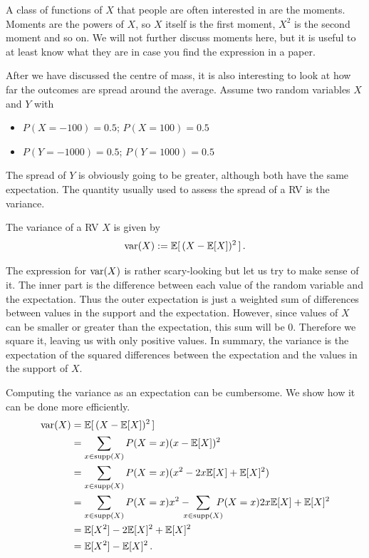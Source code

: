 A class of functions of $ X $ that people are often interested in are
the moments. Moments are the powers of $ X $, so $ X $ itself is the
first moment, $ X^{2} $ is the second moment and so on. We will not
further discuss moments here, but it is useful to at least know what
they are in case you find the expression in a paper.

\medskip
After we have discussed the centre of mass, it is also interesting to look at how far the outcomes are spread around the average. Assume two random variables $ X $ and $ Y $ with
\begin{itemize}
\item $ P(X=-100) = 0.5 $; $ P(X=100) = 0.5 $
\item $ P(Y=-1000) = 0.5 $; $ P(Y=1000) = 0.5 $
\end{itemize}
The spread of $ Y $ is obviously going to be greater, although both have the same expectation. The quantity usually used to assess
the spread of a RV is the variance.

\begin{Definition}[Variance]
The variance of a RV $ X $ is given by
$$ \operatorname{var}(X) := \mathbb{E}[\, (X - \mathbb{E}[X])^{2} \, ] \, .$$
\end{Definition}

The expression for $ \operatorname{var}(X) $ is rather scary-looking but let us try to make sense of it. The inner part is the difference between
each value of the random variable and the expectation. Thus the outer expectation is just a weighted sum of differences between 
values in the support and the expectation. However, since values of $ X $ can be smaller or greater than the expectation, this
sum will be 0. Therefore we square it, leaving us with only positive values. In summary, the variance is the expectation
of the squared differences between the expectation and the values in the support of $ X $.

Computing the variance as an expectation can be cumbersome. We show how it can be done more efficiently.
\begin{align}
\var(X) &= \E[\, (X - \E[X])^{2} \, ] \\
&= \sum_{x \in \supp(X)} P(X=x) (x - \E[X])^{2} \\
&= \sum_{x \in \supp(X)} P(X=x) (x^2 - 2x\E[X] + \E[X]^{2}) \\
&= \sum_{x \in \supp(X)} P(X=x)  x^{2} -  \!\!\!\!\! \sum_{x \in \supp(X)} \!\!\!\!\! P(X=x) 2x\E[X] + \E[X]^{2} \\
&= \E[X^{2}] -   2 \E[X]^{2} + \E[X]^{2}  \\
&= \E[X^{2}] - \E[X]^{2} \, . \label{variance}
\end{align}

